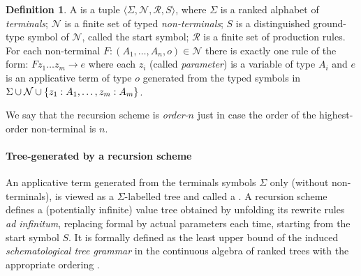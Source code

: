 \documentclass[a4paper,draft]{article}[12pt]
\theoremstyle{remark}
\theoremstyle{definition}
\newtheorem{definition}{Definition}[section]
\begin{document}
\begin{definition}
	A  is a tuple $\langle
	\Sigma, \mathcal{N}, \mathcal{R}, S \rangle$, where $\Sigma$ is a
		ranked alphabet of \emph{terminals};
		$\mathcal{N}$ is a finite set of typed \emph{non-terminals};
		$S$ is a distinguished ground-type symbol of
		$\mathcal{N}$, called the start symbol;
		$\mathcal{R}$ is a finite set of production rules. 
		For each non-terminal $F : (A_1, \ldots, A_n, o) \in \mathcal{N}$ there is exactly one rule of the form:
		$ F z_1 \ldots z_m \rightarrow e$
		where each $z_i$ (called \emph{parameter}) is a
		variable of type $A_i$ and $e$ is an applicative term of type $o$
		generated from the typed symbols in $\Sigma \cup \mathcal{N} \cup \{z_1:A_1, \ldots, z_m:A_m \}$.

	We say that the recursion scheme is \emph{order-$n$} just in case the order of the highest-order non-terminal is $n$.

\end{definition}

\paragraph{Tree-generated by a recursion scheme}
An applicative term generated from the terminals symbols $\Sigma$ only (without non-terminals), is viewed as a $\Sigma$-labelled tree and called a . A recursion scheme defines a (potentially infinite) value tree obtained by unfolding its rewrite rules \emph{ad infinitum}, replacing formal by actual parameters each time, starting from the start symbol $S$. It is formally defined as the least upper bound of the
induced \emph{schematological tree grammar} in the continuous algebra of ranked trees with the appropriate ordering \cite{KNU02,demirandathesis}.
\end{document}
